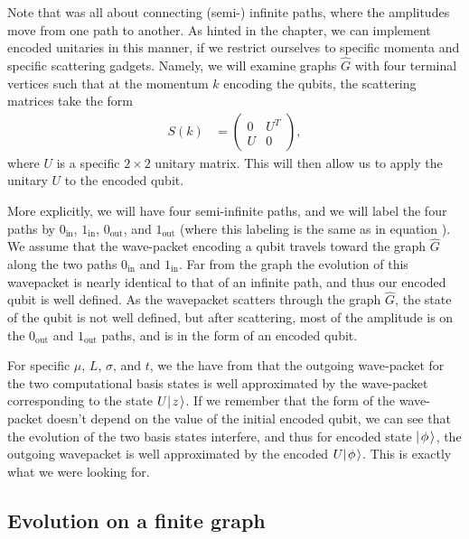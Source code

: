 \documentclass[../thesis-main/thesis-main]{subfiles}
\begin{document}
Note that  was all about connecting (semi-) infinite paths, where the amplitudes move from one path to another.  As hinted in the chapter, we can implement encoded unitaries in this manner, if we restrict ourselves to specific momenta and specific scattering gadgets.  Namely, we will examine graphs $\widehat{G}$ with four terminal vertices such that at the momentum $k$ encoding the qubits, the scattering matrices take the form
\begin{align}
  S(k) &= \begin{pmatrix} 0 & U^{T} \\
  U & 0\end{pmatrix},
  \label{eq:unitary_s_matrix}
\end{align}
where $U$ is a specific $2\times 2$ unitary matrix.  This will then allow us to apply the unitary $U$ to the encoded qubit.

More explicitly, we will have four semi-infinite paths, and we will label the four paths by $0_{\text{in}}$, $1_{\text{in}}$, $0_{\text{out}}$, and $1_{\text{out}}$ (where this labeling is the same as in equation ).  We assume that the wave-packet encoding a qubit travels toward the graph $\widehat{G}$ along the two paths $0_{\text{in}}$ and $1_{\text{in}}$.  Far from the graph the evolution of this wavepacket is nearly identical to that of an infinite path, and thus our encoded qubit is well defined.  As the wavepacket scatters through the graph $\widehat{G}$, the state of the qubit is not well defined, but after scattering, most of the amplitude is on the $0_{\text{out}}$ and $1_{\text{out}}$ paths, and is in the form of an encoded qubit. 

For specific $\mu$, $L$, $\sigma$, and $t$, we the have from  that the outgoing wave-packet for the two computational basis states is well approximated by the wave-packet corresponding to the state $U |\mspace{2mu} z \mspace{2mu} \rangle$.  If we remember that the form of the wave-packet doesn't depend on the value of the initial encoded qubit, we can see that the evolution of the two basis states interfere, and thus for  encoded state $|\mspace{2mu} \phi \mspace{2mu} \rangle$, the outgoing wavepacket is well approximated by the encoded $U|\mspace{2mu} \phi \mspace{2mu} \rangle$.  This is exactly what we were looking for.





\subsection{Evolution on a finite graph}
\end{document}
